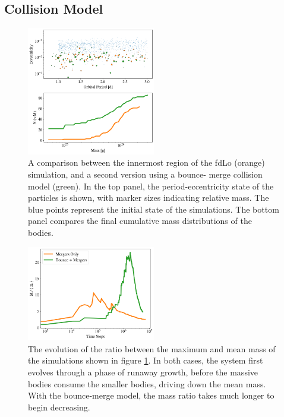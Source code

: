 \documentclass[twocolumn,linenumbers]{aastex63}
\begin{document}
\subsection{Collision Model}

\begin{figure}
\begin{center}
    \includegraphics[width=0.5\textwidth]{figures/frag_ecc.png}
    \caption{A comparison between the innermost region of the fdLo (orange) simulation, and a second version using a bounce-
    merge collision model (green). In the top panel, the period-eccentricity state of the particles is shown, with marker sizes 
    indicating relative mass. The blue points represent the initial state of the simulations. The bottom panel compares the final 
    cumulative mass distributions of the bodies. \label{fig:frag_ecc}}
\end{center}
\end{figure}

\begin{figure}
\begin{center}
    \includegraphics[width=0.5\textwidth]{figures/frag_evo.png}
    \caption{The evolution of the ratio between the maximum and mean mass of the simulations shown in figure \ref{fig:frag_ecc}. 
    In both cases, the system first evolves through a phase of runaway growth, before the massive bodies consume the smaller 
    bodies, driving down the mean mass. With the bounce-merge model, the mass ratio takes much longer to begin decreasing.\label{fig:frag_evo}}
\end{center}
\end{figure}
\end{document}
